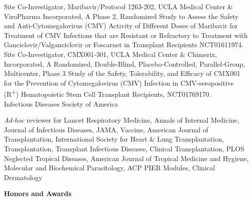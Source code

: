 \documentclass[11pt]{nih-blank}%
\newcommand{\txsp}[1]{\textsuperscript{#1}}
\numberwithin{equation}{subsection}
\numberwithin{figure}{subsection}
\numberwithin{table}{subsection}
\begin{document}
\begin{parcolumns}[colwidths={1=.86in,2=6.6in}]{2}
{      Site Co-Investigator, Maribavir/Protocol 1263-202, {\smaller UCLA} Medical Center \& ViroPharma Incorporated, A Phase 2, Randomized Study to Assess the Safety and Anti-Cytomegalovirus ({\smaller CMV}) Activity of Different Doses of Maribavir for Treatment of {\smaller CMV} Infections that are Resistant or Refractory to Treatment with Ganciclovir/Valganciclovir or Foscarnet in Transplant Recipients {\smaller NCT}01611974.\\
      Site Co-Investigator, {\smaller CMX001-301}, {\smaller UCLA} Medical Center \& Chimerix, Incorporated, A Randomized, Double-Blind, Placebo-Controlled, Parallel-Group, Multicenter, Phase 3 Study of the Safety, Tolerability, and Efficacy of {\smaller CMX}001 for the Prevention of Cytomegalovirus ({\smaller CMV}) Infection in {\smaller CMV}-seropositive (R\txsp{+}) Hematopoietic Stem Cell Transplant Recipients, {\smaller NCT}01769170.\\
      Infectious Diseases Society of America\\
      }
\end{parcolumns}

\vspace{.1in}
\textit{Ad-hoc} reviewer for Lancet Respiratory Medicine, Annals of Internal Medicine, Journal of Infectious Diseases, {\smaller JAMA}, Vaccine, American Journal of Transplantation, International Society for Heart \& Lung Transplantation, Transplantation, Transplant Infectious Diseases, Clinical Transplantation, {\smaller PLOS} Neglected Tropical Diseases, American Journal of Tropical Medicine and Hygiene, Molecular and Biochemical Parasitology, {\smaller ACP PIER} Modules, Clinical Dermatology

\smallskip
\textbf{Honors and Awards}
\vspace{-0.15in}

    
\end{document}
